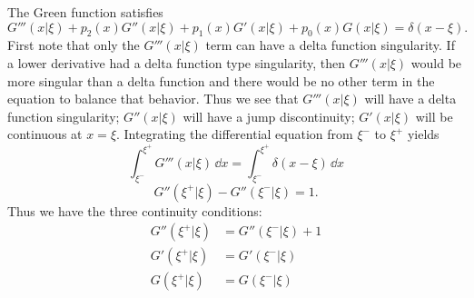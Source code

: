 {%
\begin{Solution}
  \label{solution continuity y+p2y+p1y+p0y=f}
  The Green function satisfies
  \[
  G'''(x|\xi) + p_2(x) G''(x|\xi) + p_1(x) G'(x|\xi) + p_0(x) G(x|\xi) 
  = \delta(x-\xi).
  \]
  First note that only the $G'''(x|\xi)$ term can have a delta function 
  singularity.  If a lower derivative had a delta function type singularity, 
  then $G'''(x|\xi)$ would be more singular than a delta function and there
  would be no other term in the equation to balance that behavior.  Thus we see 
  that $G'''(x|\xi)$ will have a delta function singularity; $G''(x|\xi)$ will
  have a jump discontinuity; $G'(x|\xi)$ will be continuous at $x=\xi$.
  Integrating the differential equation from $\xi^-$ to $\xi^+$ yields
  \[
  \int_{\xi^-}^{\xi^+} G'''(x|\xi) \,\dd x
  = \int_{\xi^-}^{\xi^+} \delta(x-\xi) \,\dd x
  \]
  \[
  G''(\xi^+|\xi) - G''(\xi^-|\xi) = 1.
  \]
  Thus we have the three continuity conditions:
  \begin{align*}
    G''(\xi^+|\xi) &= G''(\xi^-|\xi) + 1 \\
    G'(\xi^+|\xi) &= G'(\xi^-|\xi) \\
    G(\xi^+|\xi) &= G(\xi^-|\xi) 
  \end{align*}
\end{Solution}















}

